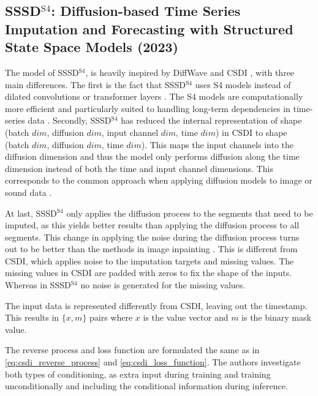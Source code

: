 \subsection{SSSD$^{\text{S4}}$: Diffusion-based Time Series Imputation and Forecasting with Structured State Space Models (2023) \cite{alcaraz_diffusion-based_2023}} \label{sec:sssds4}
The model of SSSD$^{\text{S4}}$, is heavily inspired by DiffWave \cite{kong_diffwave_2020} and CSDI \cite{tashiro_csdi_2021}, with three main differences. The first is the fact that SSSD$^{\text{S4}}$ uses S4 models \cite{gu_efficiently_2022} instead of dilated convolutions or transformer layers \cite{vaswani_attention_2017}. The S4 models are computationally more efficient and particularly suited to handling long-term dependencies in time-series data \cite{gu_efficiently_2022, goel_its_2022}. 
Secondly, SSSD$^{\text{S4}}$ has reduced the internal representation of shape (batch $dim$, diffusion $dim$, input channel $dim$,  time $dim$) in CSDI to shape (batch $dim$, diffusion $dim$, time $dim$). This maps the input channels into the diffusion dimension and thus the model only performs diffusion along the time dimension instead of both the time and input channel dimensions. This corresponds to the common approach when applying diffusion models to image or sound data \cite{alcaraz_diffusion-based_2023}. 

At last, SSSD$^{\text{S4}}$ only applies the diffusion process to the segments that need to be imputed, as this yields better results than applying the diffusion process to all segments. This change in applying the noise during the diffusion process turns out to be better than the methods in image inpainting \cite{lugmayr_repaint_2022}. This is different from CSDI, which applies noise to the imputation targets and missing values. The missing values in CSDI are padded with zeros to fix the shape of the inputs. Whereas in SSSD$^{\text{S4}}$ no noise is generated for the missing values.

The input data is represented differently from CSDI, leaving out the timestamp. This results in $\{x, m\}$ pairs where $x$ is the value vector and $m$ is the binary mask value.

The reverse process and loss function are formulated the same as in \autoref{eq:csdi_reverse_process} and \autoref{eq:csdi_loss_function}. The authors investigate both types of conditioning, as extra input during training and training unconditionally and including the conditional information during inference. 

